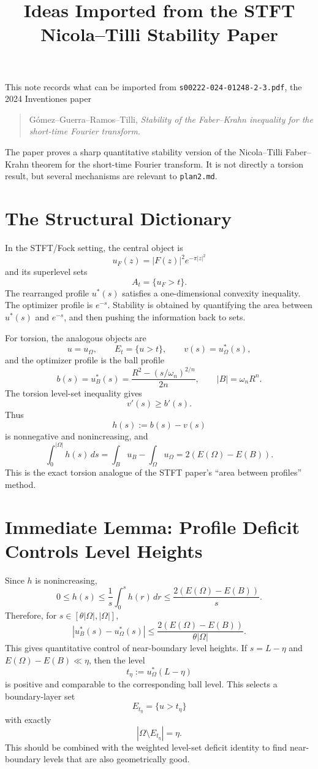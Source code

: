 \documentclass[11pt]{article}
\title{Ideas Imported from the STFT Nicola--Tilli Stability Paper}
\author{}
\date{}
\begin{document}
\maketitle

This note records what can be imported from
\texttt{s00222-024-01248-2-3.pdf}, the 2024 Inventiones paper

\begin{quote}
Gómez--Guerra--Ramos--Tilli, \emph{Stability of the Faber--Krahn inequality for
the short-time Fourier transform}.
\end{quote}

The paper proves a sharp quantitative stability version of the Nicola--Tilli
Faber--Krahn theorem for the short-time Fourier transform. It is not directly a
torsion result, but several mechanisms are relevant to \texttt{plan2.md}.

\section{The Structural Dictionary}

In the STFT/Fock setting, the central object is
\[
u_F(z)=|F(z)|^2e^{-\pi |z|^2}
\]
and its superlevel sets
\[
A_t=\{u_F>t\}.
\]
The rearranged profile \(u^*(s)\) satisfies a one-dimensional convexity
inequality. The optimizer profile is \(e^{-s}\). Stability is obtained by
quantifying the area between \(u^*(s)\) and \(e^{-s}\), and then pushing the
information back to sets.

For torsion, the analogous objects are
\[
u=u_\Omega,\qquad E_t=\{u>t\},\qquad v(s)=u_\Omega^*(s),
\]
and the optimizer profile is the ball profile
\[
b(s)=u_B^*(s)
=
\frac{R^2-(s/\omega_n)^{2/n}}{2n},
\qquad |B|=\omega_n R^n.
\]
The torsion level-set inequality gives
\[
v'(s)\ge b'(s).
\]
Thus
\[
h(s):=b(s)-v(s)
\]
is nonnegative and nonincreasing, and
\[
\int_0^{|\Omega|}h(s)\,ds
=
\int_Bu_B-\int_\Omega u_\Omega
=
2(E(\Omega)-E(B)).
\]
This is the exact torsion analogue of the STFT paper's ``area between profiles''
method.

\section{Immediate Lemma: Profile Deficit Controls Level Heights}

Since \(h\) is nonincreasing,
\[
0\le h(s)\le \frac{1}{s}\int_0^s h(r)\,dr
\le
\frac{2(E(\Omega)-E(B))}{s}.
\]
Therefore, for \(s\in[\theta|\Omega|,|\Omega|]\),
\[
|u_B^*(s)-u_\Omega^*(s)|
\le
\frac{2(E(\Omega)-E(B))}{\theta|\Omega|}.
\]
This gives quantitative control of near-boundary level heights. If \(s=L-\eta\)
and \(E(\Omega)-E(B)\ll \eta\), then the level
\[
t_\eta:=u_\Omega^*(L-\eta)
\]
is positive and comparable to the corresponding ball level. This selects a
boundary-layer set
\[
E_{t_\eta}=\{u>t_\eta\}
\]
with exactly
\[
|\Omega\setminus E_{t_\eta}|=\eta.
\]
This should be combined with the weighted level-set deficit identity to find
near-boundary levels that are also geometrically good.
\end{document}
